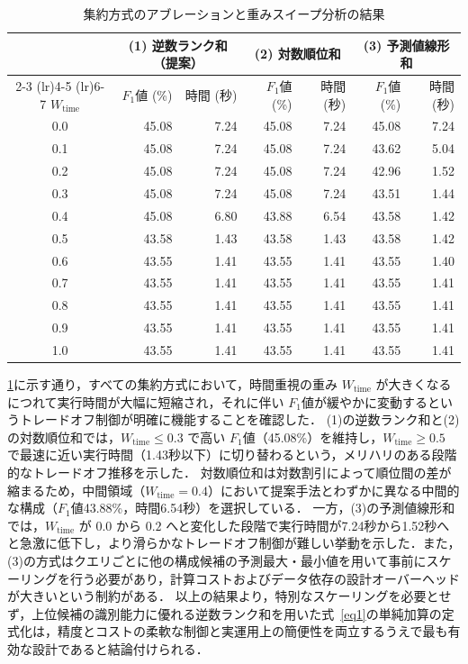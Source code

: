 \begin{table}[tb]
 \caption{集約方式のアブレーションと重みスイープ分析の結果}
 \label{tab:weight_sweep_ablation}
 \centering
 \footnotesize
 \begin{tabular}{crrrrrr}
    \toprule
    & \multicolumn{2}{c}{(1) 逆数ランク和（提案）} & \multicolumn{2}{c}{(2) 対数順位和} & \multicolumn{2}{c}{(3) 予測値線形和} \\
    \cmidrule(lr){2-3} \cmidrule(lr){4-5} \cmidrule(lr){6-7}
    $W_{\mathrm{time}}$ & $F_1$値 (\%) & 時間 (秒) & $F_1$値 (\%) & 時間 (秒) & $F_1$値 (\%) & 時間 (秒) \\
    \midrule
    0.0 & 45.08 & 7.24 & 45.08 & 7.24 & 45.08 & 7.24 \\
    0.1 & 45.08 & 7.24 & 45.08 & 7.24 & 43.62 & 5.04 \\
    0.2 & 45.08 & 7.24 & 45.08 & 7.24 & 42.96 & 1.52 \\
    0.3 & 45.08 & 7.24 & 45.08 & 7.24 & 43.51 & 1.44 \\
    0.4 & 45.08 & 6.80 & 43.88 & 6.54 & 43.58 & 1.42 \\
    0.5 & 43.58 & 1.43 & 43.58 & 1.43 & 43.58 & 1.42 \\
    0.6 & 43.55 & 1.41 & 43.55 & 1.41 & 43.55 & 1.40 \\
    0.7 & 43.55 & 1.41 & 43.55 & 1.41 & 43.55 & 1.41 \\
    0.8 & 43.55 & 1.41 & 43.55 & 1.41 & 43.55 & 1.41 \\
    0.9 & 43.55 & 1.41 & 43.55 & 1.41 & 43.55 & 1.41 \\
    1.0 & 43.55 & 1.41 & 43.55 & 1.41 & 43.55 & 1.41 \\
    \bottomrule
    \end{tabular}
\end{table}

\ref{tab:weight_sweep_ablation}に示す通り，すべての集約方式において，時間重視の重み $W_{\mathrm{time}}$ が大きくなるにつれて実行時間が大幅に短縮され，それに伴い $F_1$値が緩やかに変動するというトレードオフ制御が明確に機能することを確認した．
(1)の逆数ランク和と(2)の対数順位和では，$W_{\mathrm{time}} \le 0.3$ で高い $F_1$値（45.08\%）を維持し，$W_{\mathrm{time}} \ge 0.5$ で最速に近い実行時間（1.43秒以下）に切り替わるという，メリハリのある段階的なトレードオフ推移を示した．
対数順位和は対数割引によって順位間の差が縮まるため，中間領域（$W_{\mathrm{time}}=0.4$）において提案手法とわずかに異なる中間的な構成（$F_1$値43.88\%，時間6.54秒）を選択している．
一方，(3)の予測値線形和では，$W_{\mathrm{time}}$ が $0.0$ から $0.2$ へと変化した段階で実行時間が7.24秒から1.52秒へと急激に低下し，より滑らかなトレードオフ制御が難しい挙動を示した．また，(3)の方式はクエリごとに他の構成候補の予測最大・最小値を用いて事前にスケーリングを行う必要があり，計算コストおよびデータ依存の設計オーバーヘッドが大きいという制約がある．
以上の結果より，特別なスケーリングを必要とせず，上位候補の識別能力に優れる逆数ランク和を用いた式~\eqref{eq1}の単純加算の定式化は，精度とコストの柔軟な制御と実運用上の簡便性を両立するうえで最も有効な設計であると結論付けられる．


